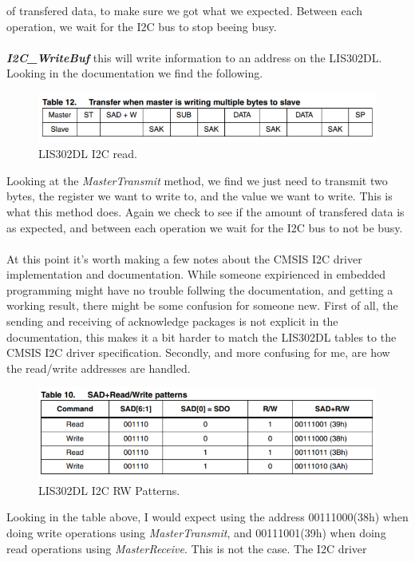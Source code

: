 \documentclass{article}
\begin{document}
of transfered data, to make sure we got what we expected. Between each operation, 
we wait for the I2C bus to stop beeing busy.\\
\\
\textbf{\textit{I2C\_WriteBuf}} this will write information to an address on the LIS302DL.
Looking in the documentation we find the following.
\begin{figure}[H]
    \centering
    \includegraphics[width=0.8\linewidth]{pics/I2CWrite.png}
    \caption{LIS302DL I2C read.}
    \label{fig:I2CRead}
\end{figure}
Looking at the \textit{MasterTransmit} method, we find we just need to transmit two bytes, 
the register we want to write to, and the value we want to write.
This is what this method does. Again we check to see if the amount of transfered data 
is as expected, and between each operation we wait for the I2C bus to not be busy.\\
\\
At this point it's worth making a few notes about the CMSIS I2C driver implementation 
and documentation. While someone expirienced in embedded programming might have
no trouble follwing the documentation, and getting a working result, there might be 
some confusion for someone new. First of all, the sending and receiving of acknowledge 
packages is not explicit in the documentation, this makes it a bit harder to match 
the LIS302DL tables to the CMSIS I2C driver specification. Secondly, and more confusing for me, 
are how the read/write addresses are handled.
\begin{figure}[H]
    \centering
    \includegraphics[width=0.8\linewidth]{pics/I2CRWPatterns.png}
    \caption{LIS302DL I2C RW Patterns.}
    \label{fig:I2CRWPatterns}
\end{figure}
Looking in the table above, I would expect using the address 00111000(38h) when 
doing write operations using \textit{MasterTransmit}, and 00111001(39h) when doing 
read operations using \textit{MasterReceive}. This is not the case. The I2C driver 
\end{document}
